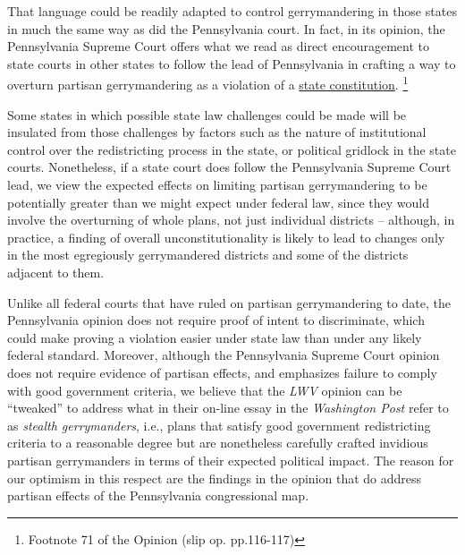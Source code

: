     That language could be readily adapted to control gerrymandering in those states in much the same way as did the Pennsylvania court. In fact, in its opinion, the Pennsylvania Supreme Court offers what we read as direct encouragement to state courts in other states to follow the lead of Pennsylvania in crafting a way to overturn partisan gerrymandering as a violation of a \underline{state constitution}.
        \footnote{Footnote 71 of the Opinion (slip op. pp.116-117)}
\par
    Some states in which possible state law challenges could be made will be insulated from those challenges by factors such as the nature of institutional control over the redistricting process in the state, or political gridlock in the state courts. Nonetheless, if a state court does follow the Pennsylvania Supreme Court lead, we view the expected effects on limiting partisan gerrymandering to be potentially greater than we might expect under federal law, since they would involve the overturning of whole plans, not just individual districts -- although, in practice, a finding of overall unconstitutionality is likely to lead to changes only in the most egregiously gerrymandered districts and some of the districts adjacent to them. 
\par
    Unlike all federal courts that have ruled on partisan gerrymandering to date, the Pennsylvania opinion does not require proof of intent to discriminate, which could make proving a violation easier under state law than under any likely federal standard. Moreover, although the Pennsylvania Supreme Court opinion does not require evidence of partisan effects, and emphasizes failure to comply with good government criteria, we believe that the \textit{LWV} opinion can be ``tweaked'' to address what \citet[][see also \citeyear{Grofman_Cervas_2018_ELJ}]{GrofmanCervas2018_WashPo} in their on-line essay in the \textit{Washington Post} refer to as \textit{stealth gerrymanders}, i.e., plans that satisfy good government redistricting criteria to a reasonable degree but are nonetheless carefully crafted invidious partisan gerrymanders in terms of their expected political impact. The reason for our optimism in this respect are the findings in the opinion that do address partisan effects of the Pennsylvania congressional map. 
